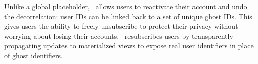 
Unlike a global placeholder, \sys~allows users to reactivate their account and undo
the decorrelation: user IDs can be linked back to a set of unique ghost IDs. 
This gives users the ability to freely unsubscribe to protect their privacy
without worrying about losing their accounts. \sys~resubscribes users by transparently propagating
updates to materialized views to expose real user identifiers in place of ghost identifiers. 



